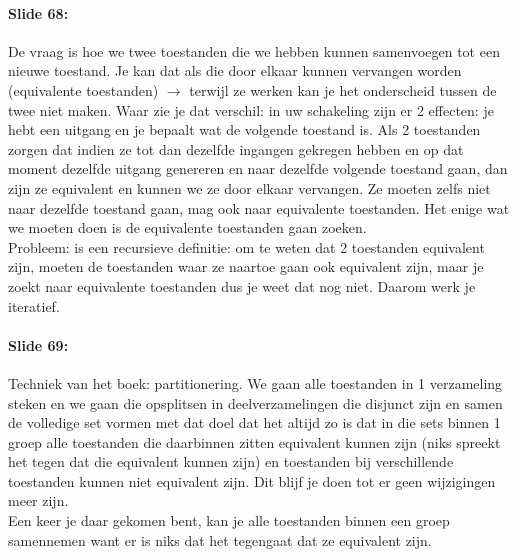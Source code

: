 \documentclass[10pt,a4paper]{book}
\begin{document}
\paragraph{Slide 68:} De vraag is hoe we twee toestanden die we hebben kunnen samenvoegen tot een nieuwe toestand. Je kan dat als die door elkaar kunnen vervangen worden (equivalente toestanden) $\rightarrow$ terwijl ze werken kan je het onderscheid tussen de twee niet maken. Waar zie je dat verschil: in uw schakeling zijn er 2 effecten: je hebt een uitgang en je bepaalt wat de volgende toestand is. Als 2 toestanden zorgen dat indien ze tot dan dezelfde ingangen gekregen hebben en op dat moment dezelfde uitgang genereren en naar dezelfde volgende toestand gaan, dan zijn ze equivalent en kunnen we ze door elkaar vervangen. Ze moeten zelfs niet naar dezelfde toestand gaan, mag ook naar equivalente toestanden. Het enige wat we moeten doen is de equivalente toestanden gaan zoeken.\\
Probleem: is een recursieve definitie: om te weten dat 2 toestanden equivalent zijn, moeten de toestanden waar ze naartoe gaan ook equivalent zijn, maar je zoekt naar equivalente toestanden dus je weet dat nog niet. Daarom werk je iteratief.

\paragraph{Slide 69:} Techniek van het boek: partitionering. We gaan alle toestanden in 1 verzameling steken en we gaan die opsplitsen in deelverzamelingen die disjunct zijn en samen de volledige set vormen met dat doel dat het altijd zo is dat in die sets binnen 1 groep alle toestanden die daarbinnen zitten equivalent kunnen zijn (niks spreekt het tegen dat die equivalent kunnen zijn) en toestanden bij verschillende toestanden kunnen niet equivalent zijn. Dit blijf je doen tot er geen wijzigingen meer zijn.\\
Een keer je daar gekomen bent, kan je alle toestanden binnen een groep samennemen want er is niks dat het tegengaat dat ze equivalent zijn.
\end{document}
